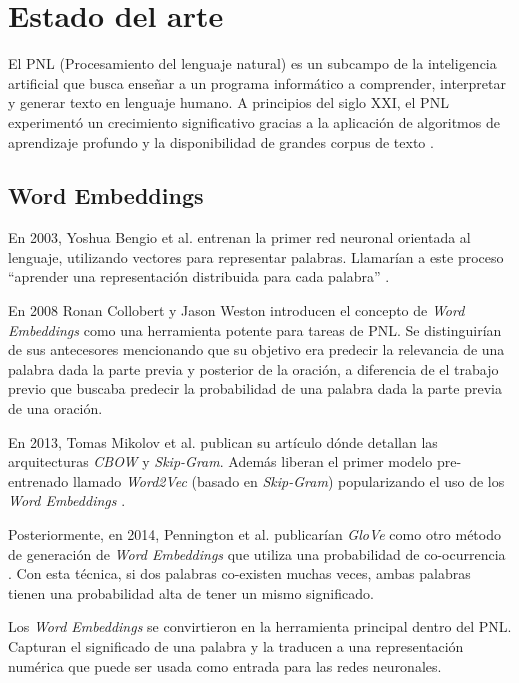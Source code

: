 
\section{Estado del arte}

El PNL (Procesamiento del lenguaje natural) es un subcampo de la inteligencia artificial que busca enseñar a un programa informático a comprender, interpretar y generar texto en lenguaje humano. A principios del siglo XXI, el PNL experimentó un crecimiento significativo gracias a la aplicación de algoritmos de aprendizaje profundo y la disponibilidad de grandes corpus de texto \citep{WEBSITE:14}.

\subsection{Word Embeddings}

En 2003, Yoshua Bengio et al. entrenan la primer red neuronal orientada al lenguaje, utilizando vectores para representar palabras. Llamarían a este proceso ``aprender una representación distribuida para cada palabra'' \citep{ARTICLE:1}.

En 2008 Ronan Collobert y Jason Weston introducen el concepto de \textit{Word Embeddings} como una herramienta potente para tareas de PNL. Se distinguirían de sus antecesores mencionando que su objetivo era predecir la relevancia de una palabra dada la parte previa y posterior de la oración, a diferencia de el trabajo previo que buscaba predecir la probabilidad de una palabra dada la parte previa de una oración.

En 2013, Tomas Mikolov et al. publican su artículo dónde detallan las arquitecturas \textit{CBOW} y \textit{Skip-Gram}. Además liberan el primer modelo pre-entrenado llamado \textit{Word2Vec} (basado en \textit{Skip-Gram}) popularizando el uso de los \textit{Word Embeddings} \citep{ARTICLE:3}.

Posteriormente, en 2014, Pennington et al. publicarían \textit{GloVe} como otro método de generación de \textit{Word Embeddings} que utiliza una probabilidad de co-ocurrencia \citep{ARTICLE:4}. Con esta técnica, si dos palabras co-existen muchas veces, ambas palabras tienen una probabilidad alta de tener un mismo significado.

Los \textit{Word Embeddings} se convirtieron en la herramienta principal dentro del PNL. Capturan el significado de una palabra y la traducen a una representación numérica que puede ser usada como entrada para las redes neuronales.


